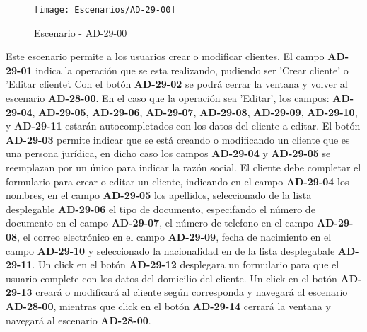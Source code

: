 \begin{figure}[H]
\centering
\texttt{[image: Escenarios/AD-29-00]}
\caption{Escenario - AD-29-00}
\label{fig:AD-29-00}
\end{figure}
Este escenario permite a los usuarios crear o modificar clientes. El campo \textbf{AD-29-01} indica la operación que se esta realizando, pudiendo ser 'Crear cliente' o 'Editar cliente'.
Con el botón \textbf{AD-29-02} se podrá cerrar la ventana y volver al escenario \textbf{AD-28-00}.
En el caso que la operación sea 'Editar', los campos: \textbf{AD-29-04}, \textbf{AD-29-05}, \textbf{AD-29-06}, \textbf{AD-29-07}, \textbf{AD-29-08}, \textbf{AD-29-09}, \textbf{AD-29-10}, y \textbf{AD-29-11} estarán autocompletados con los datos del cliente a editar.
El botón \textbf{AD-29-03} permite indicar que se está creando o modificando un cliente que es una persona jurídica, en dicho caso los campos \textbf{AD-29-04} y \textbf{AD-29-05} se reemplazan por un único para indicar la razón social. El cliente debe completar el formulario para crear o editar un cliente, indicando en el campo \textbf{AD-29-04} los nombres, en el campo \textbf{AD-29-05} los apellidos, seleccionado de la lista desplegable \textbf{AD-29-06} el tipo de documento, especifando el número de documento en el campo \textbf{AD-29-07}, el número de telefono en el campo \textbf{AD-29-08}, el correo electrónico en el campo \textbf{AD-29-09}, fecha de nacimiento en el campo \textbf{AD-29-10} y seleccionado la nacionalidad en de la lista desplegabale \textbf{AD-29-11}. 
Un click en el botón \textbf{AD-29-12} desplegara un formulario para que el usuario complete con los datos del domicilio del cliente.
Un click en el botón \textbf{AD-29-13} creará o modificará al cliente según corresponda y navegará al escenario \textbf{AD-28-00}, mientras que click en el botón \textbf{AD-29-14} cerrará la ventana y navegará al escenario \textbf{AD-28-00}.
\clearpage
